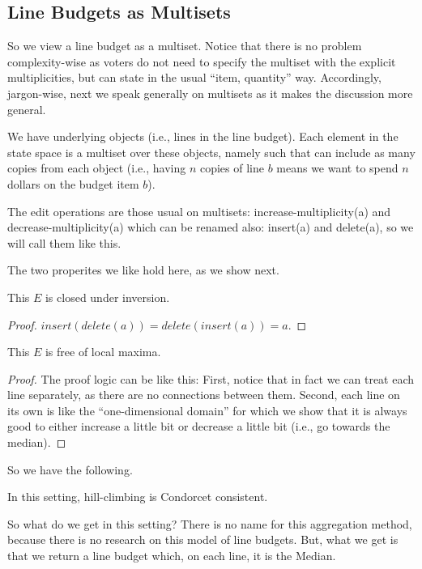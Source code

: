 \documentclass[sigconf]{aamas}  %
\begin{document}
\subsection{Line Budgets as Multisets}

So we view a line budget as a multiset. Notice that there is no problem complexity-wise as voters do not need to specify the multiset with the explicit multiplicities, but can state in the usual ``item, quantity'' way.
Accordingly, jargon-wise, next we speak generally on multisets as it makes the discussion more general.

We have underlying objects (i.e., lines in the line budget). Each element in the state space is a multiset over these objects, namely such that can include as many copies from each object (i.e., having $n$ copies of line $b$ means we want to spend $n$ dollars on the budget item $b$). 

The edit operations are those usual on multisets:  
  increase-multiplicity(a) and decrease-multiplicity(a) which can be renamed also: insert(a) and delete(a),
  so we will call them like this.

The two properites we like hold here, as we show next.

\begin{lemma}
  This $E$ is closed under inversion.
\end{lemma}

\begin{proof}
$insert(delete(a)) = delete(insert(a)) = a$.
\end{proof}

\begin{lemma}
  This $E$ is free of local maxima.
\end{lemma}

\begin{proof}
%
The proof logic can be like this:
  First, notice that in fact we can treat each line separately, as there are no connections between them.
  Second, each line on its own is like the ``one-dimensional domain'' for which we show that it is always good to either increase a little bit or decrease a little bit (i.e., go towards the median).
%
\end{proof}
  
So we have the following.

\begin{corollary}
  In this setting, hill-climbing is Condorcet consistent.
\end{corollary}

So what do we get in this setting?
There is no name for this aggregation method, because there is no research on this model of line budgets. But, what we get is that we return a line budget which, on each line, it is the Median.
\end{document}
